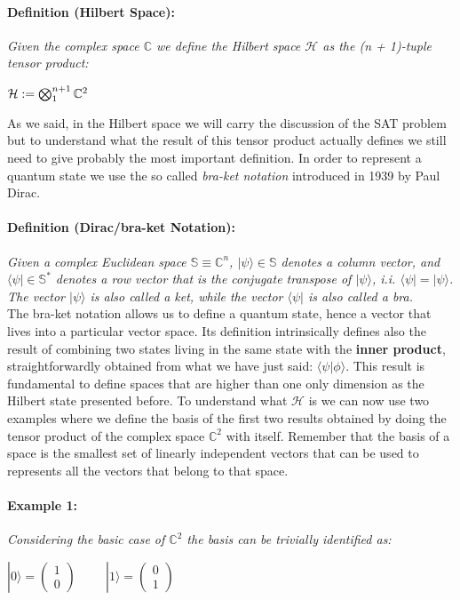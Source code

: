 \documentclass[english]{article}
\newcommand{\sbigotimes}{%
	\mathop{\mathchoice{\textstyle\bigotimes}{\bigotimes}{\bigotimes}{\bigotimes}}%
}
\newcommand{\zeroket}{\begin{pmatrix} 1 \\ 0 \end{pmatrix}}
\begin{document}
			\paragraph{Definition (Hilbert Space):} \emph{Given the complex space $\mathbb{C}$ we define the Hilbert space $\mathcal{H}$ as the (n + 1)-tuple tensor product:}
			\begin{center}
				$
				\mathcal{H} := \sbigotimes_1^{n+1} \mathbb{C}^{2}
				$
			\end{center}
		
			As we said, in the Hilbert space we will carry the discussion of the SAT problem but to understand what the result of this tensor product actually defines we still need to give probably the most important definition. In order to represent a quantum state we use the so called \emph{bra-ket notation} introduced in 1939 by Paul Dirac.
			
			\paragraph{Definition (Dirac/bra-ket Notation):} \emph{Given a complex Euclidean space $\mathbb{S} \equiv \mathbb{C}^{n}$, $|\psi\rangle \in \mathbb{S}$ denotes a column vector, and $\langle\psi| \in \mathbb{S}^{*}$ denotes a row vector that is the conjugate transpose of $|\psi\rangle$, i.i. $\langle\psi| = |\psi\rangle$. The vector $|\psi\rangle$ is also called a ket, while the vector $\langle\psi|$ is also called a bra.} \\
			
			The bra-ket notation allows us to define a quantum state, hence a vector that lives into a particular vector space. Its definition intrinsically defines also the result of combining two states living in the same state with the \textbf{inner product}, straightforwardly obtained from what we have just said: $\langle\psi|\phi\rangle$. This result is fundamental to define spaces that are higher than one only dimension as the Hilbert state presented before. To understand what $\mathcal{H}$ is we can now use two examples where we define the basis of the first two results obtained by doing the tensor product of the complex space $\mathbb{C}^{2}$ with itself. Remember that the basis of a space is the smallest set of linearly independent vectors that can be used to represents all the vectors that belong to that space.
			
			\paragraph{Example 1:} 
			\label{ex:c2}
			\emph{Considering the basic case of $\mathbb{C}^{2}$ the basis can be trivially identified as:}
			\begin{center}
				$|0\rangle = \zeroket \hspace{1cm} |1\rangle = \begin{pmatrix} 0 \\ 1 \end{pmatrix}$
			\end{center}
		
\end{document}
